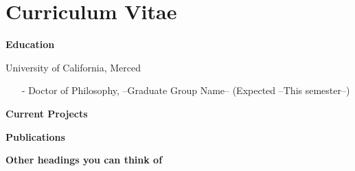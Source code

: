 \chapter*{Curriculum Vitae}
{}

\noindent \textbf{Education}

\noindent University of California, Merced
\vspace{-1em}
\begin{itemize}
    \item[-] Doctor of Philosophy, --Graduate Group Name-- (Expected --This semester--)
    \vspace{-1em}
    
\end{itemize}

\noindent \textbf{Current Projects}

\noindent \textbf{Publications}

\noindent \textbf{Other headings you can think of}


